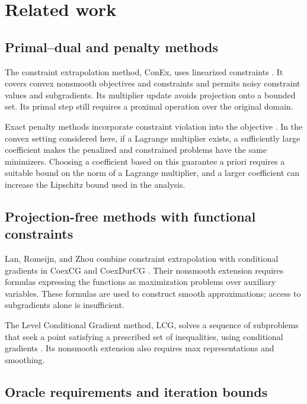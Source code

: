 \section{Related work}
\label{sec:ch4-related-work}

\subsection{Primal--dual and penalty methods}

The constraint extrapolation method, ConEx, uses linearized constraints
\cite[Section 2.1]{BoobDengLan2023ConEx}. It covers convex nonsmooth
objectives and constraints and permits noisy constraint values and
subgradients. Its multiplier update avoids projection onto a bounded set.
Its primal step still requires a proximal operation over the original domain.

Exact penalty methods incorporate constraint violation into the objective
\cite{di1994exact}. In the convex setting considered here, if a Lagrange
multiplier exists, a sufficiently large coefficient makes the penalized and
constrained problems have the same minimizers. Choosing a coefficient based
on this guarantee a priori requires a suitable bound on the norm of a
Lagrange multiplier, and a larger coefficient can increase the Lipschitz
bound used in the analysis.

\subsection{Projection-free methods with functional constraints}

Lan, Romeijn, and Zhou combine constraint extrapolation with conditional
gradients in CoexCG and CoexDurCG \cite{lan2021conditional}. Their nonsmooth
extension requires formulas expressing the functions as maximization
problems over auxiliary variables. These formulas are used to construct
smooth approximations; access to subgradients alone is insufficient.

The Level Conditional Gradient method, LCG, solves a sequence of
subproblems that seek a point satisfying a prescribed set of inequalities,
using conditional gradients
\cite{cheng2026functional}. Its nonsmooth extension also requires max
representations and smoothing.

\subsection{Oracle requirements and iteration bounds}

